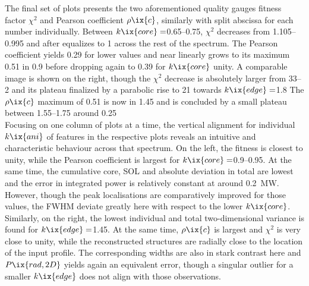                 The final set of plots presents the two aforementioned quality gauges fitness factor $\chi^{2}$ and Pearson coefficient $\rho\ix{c}$, similarly with split abscissa for each number individually. Between $k\ix{core}=$\SIrange{0.65}{0.75}{\arbitraryunit}, $\chi^{2}$ decreases from \SIrange{1.105}{0.995}{\arbitraryunit} and after equalizes to \SI{1}{\arbitraryunit} across the rest of the spectrum. The Pearson coefficient yields \SI{0.29}{\arbitraryunit} for lower values and near linearly grows to its maximum \SI{0.51}{\arbitraryunit} in \SI{0.9}{\arbitraryunit} before dropping again to \SI{0.39}{\arbitraryunit} for $k\ix{core}$ unity. A comparable image is shown on the right, though the $\chi^{2}$ decrease is absolutely larger from \SIrange{33}{2}{\arbitraryunit} and its plateau finalized by a parabolic rise to \SI{21}{\arbitraryunit} towards $k\ix{edge}=$\SI{1.8}{\arbitraryunit} The $\rho\ix{c}$ maximum of \SI{0.51}{\arbitraryunit} is now in \SI{1.45}{\arbitraryunit} and is concluded by a small plateau between \SIrange{1.55}{1.75}{\arbitraryunit} around \SI{0.25}{\arbitraryunit}\\%
                Focusing on one column of plots at a time, the vertical alignment for individual $k\ix{ani}$ of features in the respective plots reveals an intuitive and characteristic behaviour across that spectrum. On the left, the fitness is closest to unity, while the Pearson coefficient is largest for $k\ix{core}=$\SIrange{0.9}{0.95}{\arbitraryunit}. At the same time, the cumulative core, SOL and absolute deviation in total are lowest and the error in integrated power is relatively constant at around \SI{0.2}{\mega\watt}. However, though the peak localisations are comparatively improved for those values, the FWHM deviate greatly here with respect to the lower $k\ix{core}$. Similarly, on the right, the lowest individual and total two-dimensional variance is found for $k\ix{edge}=$\SI{1.45}{\arbitraryunit}. At the same time, $\rho\ix{c}$ is largest and $\chi^{2}$ is very close to unity, while the reconstructed structures are radially close to the location of the input profile. The corresponding widths are also in stark contrast here and $P\ix{rad,2D}$ yields again an equivalent error, though a singular outlier for a smaller $k\ix{edge}$ does not align with those observations.\\%
